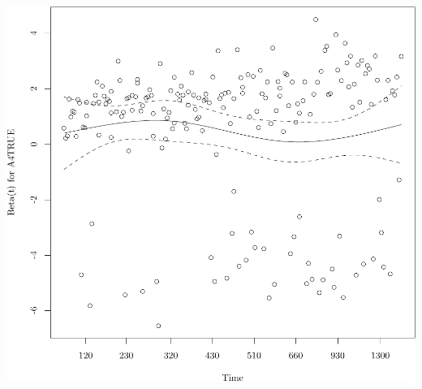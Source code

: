 \documentclass{article}
\begin{document}
\begin{knitrout}
{}




{\centering \includegraphics[width=\maxwidth]{figure/05-eda-ph-check-full-8} 

}



\end{knitrout}
\end{document}

